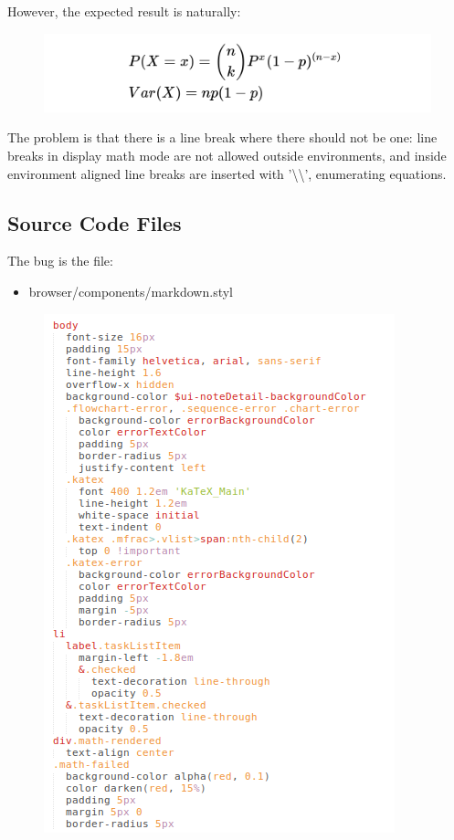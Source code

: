 \documentclass[main.tex]{subfiles}
\begin{document}
However, the expected result is naturally:

\begin{figure}[h]
\includegraphics[scale=0.6]{images/bug2.png}
\centering
\end{figure}

The problem is that there is a line break where there should not be one: line breaks in display math mode are not allowed outside environments, and inside environment aligned line breaks are inserted with '\textbackslash\textbackslash', enumerating equations.

\subsection{Source Code Files}

The bug is the file:

\begin{itemize}
\item  browser/components/markdown.styl
\end{itemize}

\begin{figure}[h]
\includegraphics[scale=0.6]{images/code.png}
\centering
\end{figure}
\end{document}

